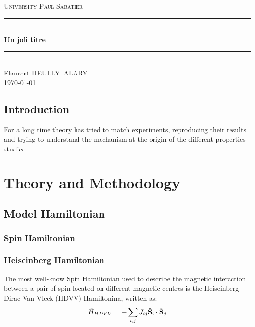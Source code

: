 \documentclass[10pt]{report}
\numberwithin{equation}{section}
\newcommand{\noun}[1]{\textsc{#1}}
\begin{document}

\begin{titlepage}
\newcommand{\HRule}{\rule{\linewidth}{0.5mm}}
\center
\textsc{\LARGE
University \noun{Paul Sabatier}
} \\[1cm]
\HRule\\[0.4cm]
{ \huge \bfseries Un joli titre \\[0.15cm] }
\HRule\\[1.5cm]
Flaurent HEULLY--ALARY
\\[1cm]
\today \\ [1cm]
\end{titlepage}
\begin{center}
\thispagestyle{plain}
\par\end{center}
\large
\tableofcontents
\newpage
\section{Introduction}
For a long time theory has tried to match experiments, reproducing their results and trying to understand the mechanism at the origin of the different properties studied.

\chapter{Theory and Methodology}

\section{Model Hamiltonian}

\subsection{Spin Hamiltonian}

\subsection*{Heiseinberg Hamiltonian}
The most well-know Spin Hamiltonian used to describe the magnetic interaction between a pair of spin located on different magnetic centres is the Heiseinberg-Dirac-Van Vleck (HDVV) Hamiltonina, written as:
\begin{equation}\label{Hheis}
    \hat{H}_{HDVV}=-\sum_{i,j} J_{ij} \hat{\vb S}_i \cdot \hat{\vb S}_j
\end{equation}
\end{document}
